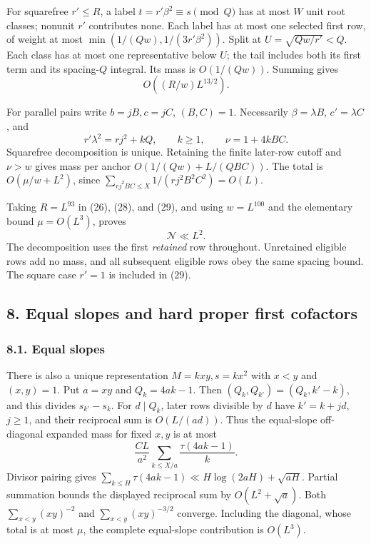 \documentclass[
  english,
  11pt,
]{article}
\begin{document}
For squarefree \(r'\le R\), a label \(t=r'\beta^2\equiv s\pmod Q\) has
at most \(W\) unit root classes; nonunit \(r'\) contributes none. Each
label has at most one selected first row, of weight at most
\(\min(1/(Qw),1/(3r'\beta^2))\). Split at \(U=\sqrt{Qw/r'}<Q\). Each
class has at most one representative below \(U\); the tail includes both
its first term and its spacing-\(Q\) integral. Its mass is
\(O(1/(Qw))\). Summing gives \[
O((R/w)L^{13/2}). \tag{29}
\]

For parallel pairs write \(b=jB,c=jC\), \((B,C)=1\). Necessarily
\(\beta=\lambda B\), \(c'=\lambda C\), and \[
r'\lambda^2=rj^2+kQ,\qquad k\ge1,\qquad \nu=1+4kBC.
\] Squarefree decomposition is unique. Retaining the finite later-row
cutoff and \(\nu>w\) gives mass per anchor \(O(1/(Qw)+L/(QBC))\). The
total is \(O(\mu/w+L^2)\), since
\(\sum_{rj^2BC\le X}1/(rj^2B^2C^2)=O(L)\).

Taking \(R=L^{93}\) in (26), (28), and (29), and using \(w=L^{100}\) and
the elementary bound \(\mu=O(L^3)\), proves \[
\mathcal N\ll L^2. \tag{30}
\] The decomposition uses the first \emph{retained} row throughout.
Unretained eligible rows add no mass, and all subsequent eligible rows
obey the same spacing bound. The square case \(r'=1\) is included in
(29).

\subsection{8. Equal slopes and hard proper first
cofactors}\label{equal-slopes-and-hard-proper-first-cofactors}

\subsubsection{8.1. Equal slopes}\label{equal-slopes}

There is also a unique representation \(M=kxy,s=kx^2\) with \(x<y\) and
\((x,y)=1\). Put \(a=xy\) and \(Q_k=4ak-1\). Then
\((Q_k,Q_{k'})=(Q_k,k'-k)\), and this divides \(s_{k'}-s_k\). For
\(d\mid Q_k\), later rows divisible by \(d\) have \(k'=k+jd\),
\(j\ge1\), and their reciprocal sum is \(O(L/(ad))\). Thus the
equal-slope off-diagonal expanded mass for fixed \(x,y\) is at most \[
\frac{CL}{a^2}\sum_{k\le X/a}\frac{\tau(4ak-1)}k.
\] Divisor pairing gives
\(\sum_{k\le H}\tau(4ak-1)\ll H\log(2aH)+\sqrt{aH}\). Partial summation
bounds the displayed reciprocal sum by \(O(L^2+\sqrt a)\). Both
\(\sum_{x<y}(xy)^{-2}\) and \(\sum_{x<y}(xy)^{-3/2}\) converge.
Including the diagonal, whose total is at most \(\mu\), the complete
equal-slope contribution is \(O(L^3)\).
\end{document}
